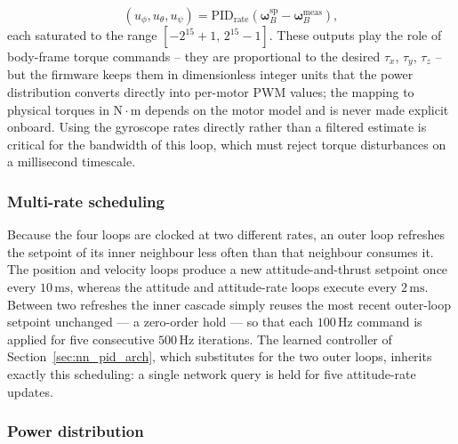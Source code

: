 \documentclass[11pt,a4paper]{article}
\theoremstyle{remark}
\numberwithin{equation}{section}
\begin{document}
\begin{enumerate}
    \begin{equation}
    (u_\phi, u_\theta, u_\psi) =
    \mathrm{PID}_{\mathrm{rate}}\!\left(
    \boldsymbol{\omega}_B^{\mathrm{sp}} - \boldsymbol{\omega}_B^{\mathrm{meas}}\right),
    \end{equation}
    each saturated to the range $[-2^{15}+1,\, 2^{15}-1]$. These outputs play the role of
    body-frame torque commands -- they are proportional to the desired $\tau_x$, $\tau_y$,
    $\tau_z$ -- but the firmware keeps them in dimensionless integer units that the power
    distribution converts directly into per-motor PWM values; the mapping to physical
    torques in $\mathrm{N\cdot m}$ depends on the motor model and is never made explicit
    onboard. Using the gyroscope rates directly rather than a filtered estimate is critical
    for the bandwidth of this loop, which must reject torque disturbances on a millisecond
    timescale.
\end{enumerate}

\subsubsection*{Multi-rate scheduling}

Because the four loops are clocked at two different rates, an outer loop refreshes the
setpoint of its inner neighbour less often than that neighbour consumes it. The position
and velocity loops produce a new attitude-and-thrust setpoint once every $10\,\mathrm{ms}$,
whereas the attitude and attitude-rate loops execute every $2\,\mathrm{ms}$. Between two
refreshes the inner cascade simply reuses the most recent outer-loop setpoint unchanged ---
a zero-order hold --- so that each $100\,\mathrm{Hz}$ command is applied for five
consecutive $500\,\mathrm{Hz}$ iterations. The learned controller of
Section~\ref{sec:nn_pid_arch}, which substitutes for the two outer loops, inherits exactly
this scheduling: a single network query is held for five attitude-rate updates.

\subsubsection*{Power distribution}
\end{document}

